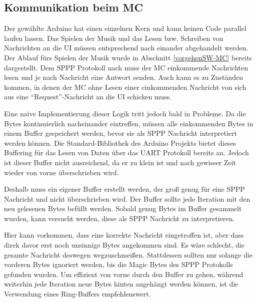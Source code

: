 \subsection{Kommunikation beim \ac{MC}} \label{umsetzungSW-Kommunikation-MC}

Der gewählte Arduino hat einen einzelnen Kern und kann keinen Code parallel laufen lassen.
Das Spielen der Musik und das Lesen bzw. Schreiben von Nachrichten an die \ac{UI} müssen entsprechend nach einander abgehandelt werden.
Der Ablauf fürs Spielen der Musik wurde in Abschnitt \ref{vorgehenSW-MC} bereits dargestellt.
Dem \ac{SPPP} Protokoll nach muss der \ac{MC} einkommende Nachrichten lesen und je nach Nachricht eine Antwort senden.
Auch kann es zu Zuständen kommen, in denen der \ac{MC} ohne Lesen einer einkommenden Nachricht von sich aus eine \enquote{Request}-Nachricht an die \ac{UI} schicken muss.

Eine naive Implementierung dieser Logik tritt jedoch bald in Probleme.
Da die Bytes kontinuierlich nacheinander eintreffen, müssen alle einkommenden Bytes in einem Buffer gespeichert werden, bevor sie als \ac{SPPP} Nachricht interpretiert werden können.
Die Standard-Bibliothek des Arduino Projekts bietet dieses Buffering für das Lesen von Daten über das \ac{UART} Protokoll bereits an.
Jedoch ist dieser Buffer nicht ausreichend, da er zu klein ist und nach gewisser Zeit wieder von vorne überschrieben wird. %

Deshalb muss ein eigener Buffer erstellt werden, der groß genug für eine \ac{SPPP} Nachricht und nicht überschrieben wird.
Der Buffer sollte jede Iteration mit den neu gelesenen Bytes befüllt werden.
Sobald genug Bytes im Buffer gesammelt wurden, kann versucht werden, diese als \ac{SPPP} Nachricht zu interpretieren.

Hier kann vorkommen, dass eine korrekte Nachricht eingetroffen ist, aber dass direk davor erst noch unsinnige Bytes angekommen sind.
Es wäre schlecht, die gesamte Nachricht deswegen wegzuschmeißen.
Stattdessen sollten nur solange die vorderen Bytes ignoriert werden, bis die Magic Bytes des \ac{SPPP} Protokolls gefunden wurden.
Um effizient von vorne durch den Buffer zu gehen, während weiterhin jede Iteration neue Bytes hinten angehängt werden können, ist die Verwendung eines Ring-Buffers empfehlenswert.

